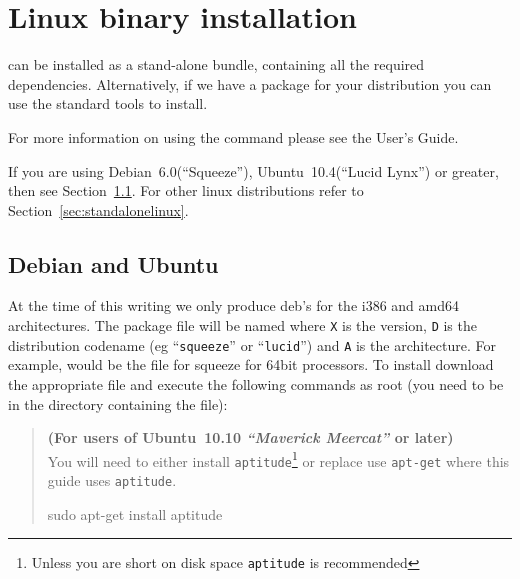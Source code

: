 %
%
%

\section{Linux binary installation}
\label{sec:binlinux}

\esfinley can be installed as a stand-alone bundle, containing all the required dependencies.
Alternatively, if we have a package for your distribution you can use the standard tools to install.


For more information on using the  command please see the User's Guide.

If you are using Debian~6.0(``Squeeze''), Ubuntu~10.4(``Lucid Lynx'') or greater, then see Section~\ref{sec:debian}.
For other linux distributions refer to Section~\ref{sec:standalonelinux}.

\subsection{Debian and Ubuntu}\label{sec:debian}

At the time of this writing we only produce deb's for the i386 and amd64 architectures.
The package file will be named  where \texttt{X} is the version, \texttt{D} 
is the distribution codename (eg ``\texttt{squeeze}'' or ``\texttt{lucid}'') and \texttt{A} is the architecture.
For example,  would be the file for squeeze for 64bit processors.
To install \esfinley download the appropriate  file and execute the following 
commands as root (you need to be in the directory containing the file):

\begin{verse}
\textbf{(For users of Ubuntu~10.10 \textit{``Maverick Meercat''} or later)}\\
You will need to either install \texttt{aptitude}\footnote{Unless you are short on disk space \texttt{aptitude} is recommended} or replace use \texttt{apt-get} where this guide uses \texttt{aptitude}.
\begin{shellCode}
sudo apt-get install aptitude
\end{shellCode}
\end{verse}

